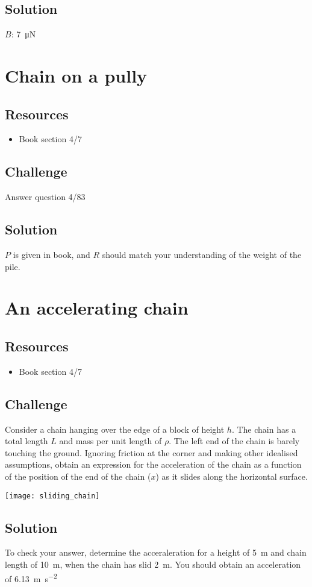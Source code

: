 \subsection*{Solution}
$B$: \SI{7}{\micro\newton}




\newpage
\section{Chain on a pully}

\subsection*{Resources}
\begin{itemize}
    \item Book section 4/7
\end{itemize}

\subsection*{Challenge}
Answer question 4/83

\subsection*{Solution}
$P$ is given in book, and $R$ should match your understanding of the weight of the pile.




\newpage
\section{An accelerating chain}

\subsection*{Resources}
\begin{itemize}
    \item Book section 4/7
\end{itemize}

\subsection*{Challenge}
Consider a chain hanging over the edge of a block of height $h$.  The chain has a total length $L$ and mass per unit length of $\rho$. The left end of the chain is barely touching the ground. Ignoring friction at the corner and making other idealised assumptions, obtain an expression for the acceleration of the chain as a function of the position of the end of the chain ($x$) as it slides along the horizontal surface.

\texttt{[image: sliding\_chain]}

\subsection*{Solution}
To check your answer, determine the acceraleration for a height of \SI{5}{\meter} and chain length of \SI{10}{\meter}, when the chain has slid \SI{2}{m}. You should obtain an acceleration of \SI{6.13}{\meter\per\square\second}
